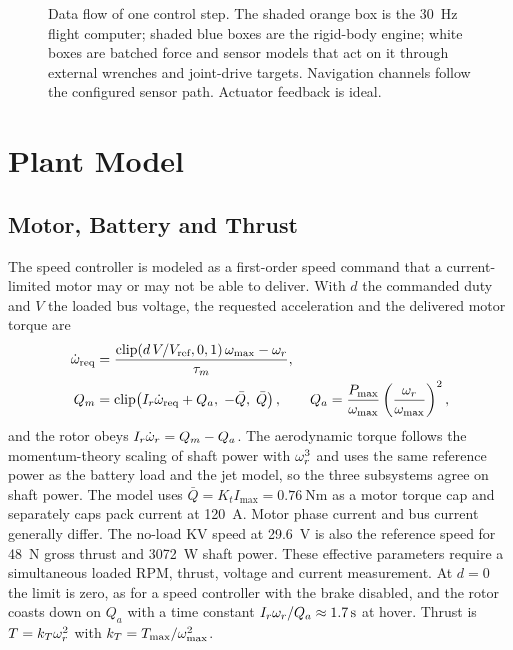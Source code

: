 \documentclass[10pt,letterpaper]{article}
\begin{document}
\begin{figure}[t]
{}
\caption{Data flow of one control step. The shaded orange box is the \SI{30}{\hertz} flight computer; shaded blue boxes are the rigid-body engine; white boxes are batched force and sensor models that act on it through external wrenches and joint-drive targets. Navigation channels follow the configured sensor path. Actuator feedback is ideal.}
\label{fig:dataflow}
\end{figure}

\section{Plant Model}
\label{sec:plant}

\subsection{Motor, Battery and Thrust}
\label{sec:motor}

The speed controller is modeled as a first-order speed command that a current-limited motor may or may not be able to deliver.
With $d$ the commanded duty and $V$ the loaded bus voltage, the requested acceleration and the delivered motor torque are
\begin{align}
\dot\omega_{\text{req}} &= \frac{\mathrm{clip}(d\,V/V_{\text{ref}}, 0, 1)\,\omega_{\max} - \omega_r}{\tau_m}, \label{eq:esc}\\
Q_m &= \mathrm{clip}\!\left(I_r\dot\omega_{\text{req}} + Q_a,\; -\bar Q,\; \bar Q\right), \qquad
Q_a = \frac{P_{\max}}{\omega_{\max}}\left(\frac{\omega_r}{\omega_{\max}}\right)^{2}, \label{eq:motor}
\end{align}
and the rotor obeys $I_r\dot\omega_r = Q_m - Q_a$.
The aerodynamic torque follows the momentum-theory scaling of shaft power with $\omega_r^3$ and uses the same reference power as the battery load and the jet model, so the three subsystems agree on shaft power.
The model uses $\bar Q=K_t I_{\max}=\SI{0.76}{\newton\metre}$ as a motor torque cap and separately caps pack current at \SI{120}{\ampere}. Motor phase current and bus current generally differ. The no-load KV speed at \SI{29.6}{\volt} is also the reference speed for \SI{48}{\newton} gross thrust and \SI{3072}{\watt} shaft power. These effective parameters require a simultaneous loaded RPM, thrust, voltage and current measurement.
At $d = 0$ the limit is zero, as for a speed controller with the brake disabled, and the rotor coasts down on $Q_a$ with a time constant $I_r\omega_r/Q_a \approx \SI{1.7}{\second}$ at hover.
Thrust is $T = k_T\omega_r^2$ with $k_T = T_{\max}/\omega_{\max}^2$.
\end{document}
